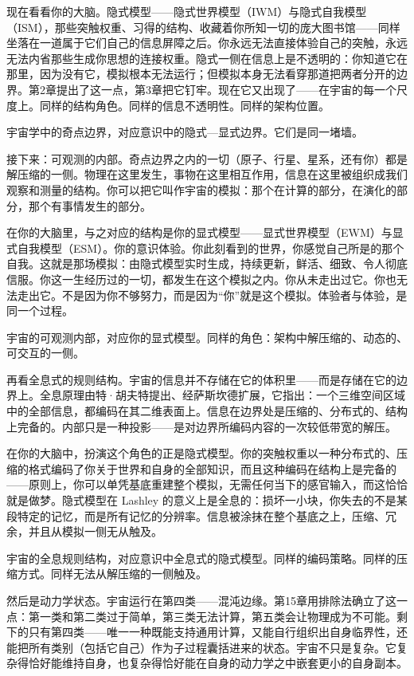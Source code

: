 \documentclass[11pt, twoside, openright]{book}
\begin{document}
现在看看你的大脑。隐式模型------隐式世界模型（IWM）与隐式自我模型（ISM），那些突触权重、习得的结构、收藏着你所知一切的庞大图书馆------同样坐落在一道属于它们自己的信息屏障之后。你永远无法直接体验自己的突触，永远无法内省那些生成你思想的连接权重。隐式一侧在信息上是不透明的：你知道它在那里，因为没有它，模拟根本无法运行；但模拟本身无法看穿那道把两者分开的边界。第2章提出了这一点，第3章把它钉牢。现在它又出现了------在宇宙的每一个尺度上。同样的结构角色。同样的信息不透明性。同样的架构位置。

宇宙学中的奇点边界，对应意识中的隐式---显式边界。它们是同一堵墙。

接下来：可观测的内部。奇点边界之内的一切（原子、行星、星系，还有你）都是解压缩的一侧。物理在这里发生，事物在这里相互作用，信息在这里被组织成我们观察和测量的结构。你可以把它叫作宇宙的模拟：那个在计算的部分，在演化的部分，那个有事情发生的部分。

在你的大脑里，与之对应的结构是你的显式模型------显式世界模型（EWM）与显式自我模型（ESM）。你的意识体验。你此刻看到的世界，你感觉自己所是的那个自我。这就是那场模拟：由隐式模型实时生成，持续更新，鲜活、细致、令人彻底信服。你这一生经历过的一切，都发生在这个模拟之内。你从未走出过它。你也无法走出它。不是因为你不够努力，而是因为“你”就是这个模拟。体验者与体验，是同一个过程。

宇宙的可观测内部，对应你的显式模型。同样的角色：架构中解压缩的、动态的、可交互的一侧。

再看全息式的规则结构。宇宙的信息并不存储在它的体积里------而是存储在它的边界上。全息原理由特·胡夫特提出、经萨斯坎德扩展，它指出：一个三维空间区域中的全部信息，都编码在其二维表面上。信息在边界处是压缩的、分布式的、结构上完备的。内部只是一种投影------是对边界所编码内容的一次较低带宽的解压。

在你的大脑中，扮演这个角色的正是隐式模型。你的突触权重以一种分布式的、压缩的格式编码了你关于世界和自身的全部知识，而且这种编码在结构上是完备的------原则上，你可以单凭基底重建整个模拟，无需任何当下的感官输入，而这恰恰就是做梦。隐式模型在 Lashley 的意义上是全息的：损坏一小块，你失去的不是某段特定的记忆，而是所有记忆的分辨率。信息被涂抹在整个基底之上，压缩、冗余，并且从模拟一侧无从触及。

宇宙的全息规则结构，对应意识中全息式的隐式模型。同样的编码策略。同样的压缩方式。同样无法从解压缩的一侧触及。

然后是动力学状态。宇宙运行在第四类------混沌边缘。第15章用排除法确立了这一点：第一类和第二类过于简单，第三类无法计算，第五类会让物理成为不可能。剩下的只有第四类------唯一一种既能支持通用计算，又能自行组织出自身临界性，还能把所有类别（包括它自己）作为子过程囊括进来的状态。宇宙不只是复杂。它复杂得恰好能维持自身，也复杂得恰好能在自身的动力学之中嵌套更小的自身副本。
\end{document}
